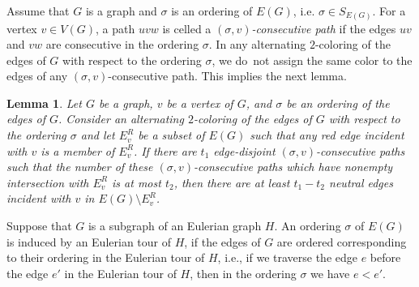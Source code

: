 \documentclass[11pt]{article}
\newtheorem{prelem}{{\bf Lemma}}
\newenvironment{lem}{\begin{prelem}{\hspace{-0.5
               em}{\bf.\ }}}{\end{prelem}}
\begin{document}
Assume that $G$ is a graph and $\sigma$ is an ordering of $E(G)$, i.e. $\sigma\in S_{E(G)}$. 
For a vertex $v\in V(G)$, a path $uvw$ is celled a {\it $(\sigma,v)$-consecutive path} 
if the edges $uv$ and $vw$ are consecutive in the ordering $\sigma$. 
In any alternating $2$-coloring of the edges of $G$ with respect to the ordering $\sigma$, we do~not assign the same color 
to the edges of any $(\sigma,v)$-consecutive path. 
This implies the next lemma.
\begin{lem}\label{consecutive}
Let $G$ be a graph, $v$ be a vertex of $G$, and $\sigma$ be an ordering of the edges of $G$. 
Consider an alternating $2$-coloring of the edges of $G$ with respect to the ordering $\sigma$ and 
let $E_v^R$ be a subset of $E(G)$ such that any red edge incident with $v$ is a member of $E_v^R$.  
If there are $t_1$ edge-disjoint $(\sigma,v)$-consecutive paths such that the number of 
these $(\sigma,v)$-consecutive paths  which have nonempty 
intersection with $E_v^R$ is at most $t_2$, 
then there are at least $t_1-t_2$ neutral edges incident with $v$ in $E(G)\setminus E_v^R$. 
\end{lem}
Suppose that $G$ is a subgraph of an Eulerian graph $H$. An ordering $\sigma$ of $E(G)$ is induced by an Eulerian tour of $H$, if 
the edges of $G$ are ordered corresponding to their ordering in the Eulerian tour of $H$, i.e.,
if we traverse the edge $e$ before the edge $e'$ in the Eulerian tour of $H$, then in the ordering $\sigma$ we have $e < e'$. 
\end{document}

